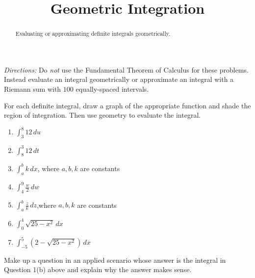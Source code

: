 \documentclass{ximera}
\title{Geometric Integration}
\begin{document}
\begin{abstract}
Evaluating or approximating definite integrals geometrically.
\end{abstract}
\maketitle


\emph{Directions:} Do \emph{not} use the Fundamental Theorem of Calculus for these problems. Instead evaluate an integral geometrically or approximate an integral with a Riemann sum with $100$ equally-spaced intervals.

\begin{question} \label{QOOOREfbxx3er}
For each definite integral, draw a graph of the appropriate function and shade the region of integration. Then use geometry to evaluate the integral.

\begin{enumerate}

\item $\int_3^8 12 \, du$

\item $\int_8^3 12 \, dt$

\item $\int_a^b k \, dx$, where $a,b,k$ are constants

\item $\int_4^9 \frac{w}{2} \, dw$

\item $\int_a^b \frac{z}{k} \, dz$,where $a,b,k$ are constants

\item $\int_0^4 \sqrt{25-x^2}\, dx$

\item $\int_{-5}^5 \left( 2-\sqrt{25-x^2} \right)\, dx$

\end{enumerate} 
\end{question}

\begin{question}  \label{QPPlDlfe343421}
Make up a question in an applied scenario whose answer is the integral in Question 1(b) above and explain why the answer makes sense.
\end{question}
\end{document}
